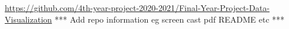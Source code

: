 \appendix
\chapter{}

\url{https://github.com/4th-year-project-2020-2021/Final-Year-Project-Data-Visualization}
*** Add repo information eg screen cast pdf README etc ***